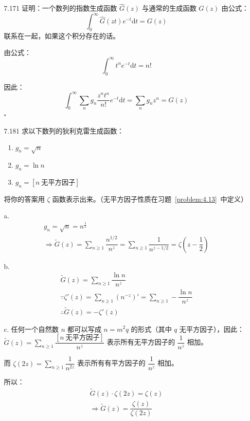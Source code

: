 \begin{problem}{7.17}{1}
  证明：一个数列的指数生成函数 \( \hat{G}(z) \) 与通常的生成函数 \( G(z) \) 由公式：
  \[
    \int_0^{\infty} \hat{G}(zt) e^{-t} \mathrm{d}t = G(z)
  \]
  联系在一起，如果这个积分存在的话。
\end{problem}

由公式：
\[
  \boxed{\int_0^{\infty} t^n e^{-t} \mathrm{d} t = n!}
\]

因此：
\[
  \int_0^{\infty} \sum_n g_n \dfrac{z^n t^n}{n!} e^{-t} \mathrm{d} t = \sum_n g_n z^n = G(z)
\]
\hfill \( \square \)

\begin{problem}{7.18}{1}
  求以下数列的狄利克雷生成函数：
  \begin{enumerate}
    \item[a] \( g_n = \sqrt{n} \)
    \item[b] \( g_n = \ln{n} \)
    \item[c] \( g_n = [n \ \text{无平方因子}] \)
  \end{enumerate}
  将你的答案用 \( \zeta \) 函数表示出来。（无平方因子性质在习题~\ref{problem:4.13}~中定义）
\end{problem}

a.
\begin{gather*}
  g_n = \sqrt{n} = n^{\frac{1}{2}} \\
  \Rightarrow \tilde{G}(z) = \sum_{n \geqslant 1} \dfrac{n^{1/2}}{n^z} = \sum_{n \geqslant 1} \dfrac{1}{n^{z - 1/2}} = \zeta (z - \dfrac{1}{2})
\end{gather*}

b.
\begin{gather*}
  \tilde{G}(z) = \sum_{n \geqslant 1} \dfrac{\ln{n}}{n^z} \\
  \because \zeta'(z) = \sum_{n \geqslant 1} (n^{-z})' = \sum_{n \geqslant 1} - \dfrac{\ln{n}}{n^z} \\
  \therefore \tilde{G}(z) = - \zeta'(z)
\end{gather*}

c. 任何一个自然数 \( n \) 都可以写成 \( n = m^2 q \) 的形式（其中 \( q \) 无平方因子），因此：\( \tilde{G}(z) = \sum_{n \geqslant 1} \dfrac{[n \ \text{无平方因子}]}{n^z} \) 表示所有无平方因子的 \( \dfrac{1}{n^z} \) 相加。

而 \( \zeta{(2z)} = \sum_{n \geqslant 1} \dfrac{1}{n^{2z}} \) 表示所有有平方因子的 \( \dfrac{1}{n^z} \) 相加。

所以：
\begin{gather*}
  \tilde{G}(z) \cdot \zeta{(2z)} = \zeta{(z)} \\
  \Rightarrow \tilde{G}(z) = \dfrac{\zeta{(z)}}{\zeta{(2z)}}
\end{gather*}


